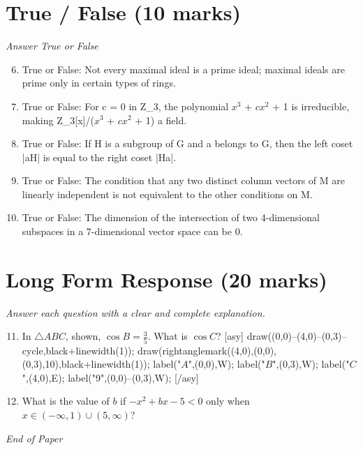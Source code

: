 \documentclass[12pt]{article}
\begin{document}
\section*{True / False (10 marks)}
\textit{Answer True or False}
\begin{enumerate}[label=\arabic*.]
\setcounter{enumi}{5}
\item True or False: Not every maximal ideal is a prime ideal; maximal ideals are prime only in certain types of rings.
\item True or False: For c = 0 in Z\_3, the polynomial $x^3$ + $cx^2$ + 1 is irreducible, making Z\_3[x]/($x^3$ + $cx^2$ + 1) a field.
\item True or False: If H is a subgroup of G and a belongs to G, then the left coset |aH| is equal to the right coset |Ha|.
\item True or False: The condition that any two distinct column vectors of M are linearly independent is not equivalent to the other conditions on M.
\item True or False: The dimension of the intersection of two 4-dimensional subspaces in a 7-dimensional vector space can be 0.
\end{enumerate}

\section*{Long Form Response (20 marks)}
\textit{Answer each question with a clear and complete explanation.}
\begin{enumerate}[label=\arabic*.]
\setcounter{enumi}{10}
\item In $\triangle{ABC}$, shown, $\cos{B}=\frac{3}{5}$. What is $\cos{C}$? [asy] draw((0,0)--(4,0)--(0,3)--cycle,black+linewidth(1)); draw(rightanglemark((4,0),(0,0),(0,3),10),black+linewidth(1)); label("$A$",(0,0),W); label("$B$",(0,3),W); label("$C$",(4,0),E); label("9",(0,0)--(0,3),W); [/asy]
\item What is the value of $b$ if $-x^2+bx-5<0$ only when $x\in (-\infty, 1)\cup(5,\infty)$?
\end{enumerate}

\vfill
\noindent\textit{End of Paper}
\end{document}
